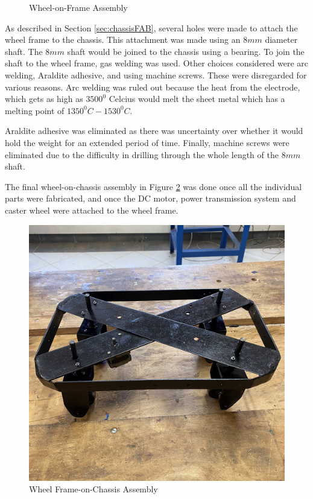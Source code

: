 \begin{figure}[H]
    \caption{Wheel-on-Frame Assembly}
    \label{fig:frameFAB}
\end{figure}

As described in Section \ref{sec:chassisFAB}, several holes were made to attach the wheel frame to the chassis. This attachment was made using an $8mm$ diameter shaft. The $8mm$ shaft would be joined to the chassis using a bearing. To join the shaft to the wheel frame, gas welding was used. Other choices considered were arc welding, Araldite adhesive, and using machine screws. These were disregarded for various reasons. Arc welding was ruled out because the heat from the electrode, which gets as high as $3500^0$ Celcius \cite{noauthor_what_nodate} would melt the sheet metal which has a melting point of $1350^0 C - 1530^0 C$.\cite{noauthor_faq_nodate}

Araldite adhesive was eliminated as there was uncertainty over whether it would hold the weight for an extended period of time. Finally, machine screws were eliminated due to the difficulty in drilling through the whole length of the $8mm$ shaft.

The final wheel-on-chassis assembly in Figure \ref{fig:wheelChassis} was done once all the individual parts were fabricated, and once the \ac{DC} motor, power transmission system and caster wheel were attached to the wheel frame.

\begin{figure}[H]
    \centering
    \includegraphics[scale = 0.1]{Figures/wheelCHASSISassembly.jpg}
    \caption{Wheel Frame-on-Chassis Assembly}
    \label{fig:wheelChassis}
\end{figure}



